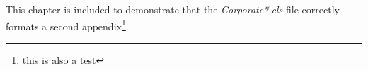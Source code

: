 This chapter is included to demonstrate that the \emph{Corporate*.cls} file correctly formats a second appendix\footnote{this is also a test}.